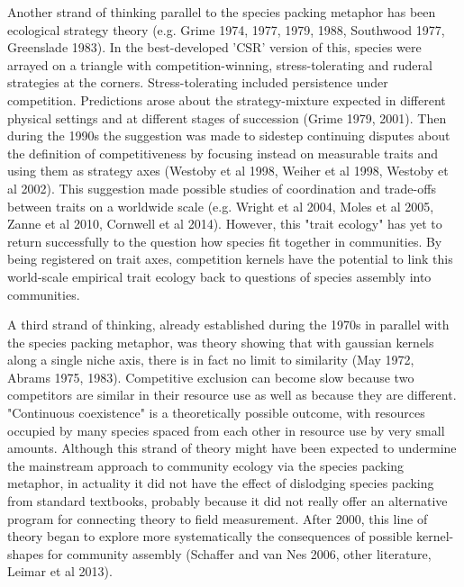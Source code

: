 \documentclass[a4paper,11pt]{article}
\begin{document}
Another strand of thinking parallel to the species packing metaphor has been ecological strategy theory (e.g. Grime 1974, 1977, 1979, 1988, Southwood 1977, Greenslade 1983). In the best-developed 'CSR' version of this, species were arrayed on a triangle with competition-winning, stress-tolerating and ruderal strategies at the corners. Stress-tolerating included persistence under competition. Predictions arose about the strategy-mixture expected in different physical settings and at different stages of succession (Grime 1979, 2001). Then during the 1990s the suggestion was made to sidestep continuing disputes about the definition of competitiveness by focusing instead on measurable traits and using them as strategy axes (Westoby et al 1998, Weiher et al 1998, Westoby et al 2002). This suggestion made possible studies of coordination and trade-offs between traits on a worldwide scale (e.g. Wright et al 2004, Moles et al 2005, Zanne et al 2010, Cornwell et al 2014). However, this "trait ecology" has yet to return successfully to the question how species fit together in communities. By being registered on trait axes, competition kernels have the potential to link this world-scale empirical trait ecology back to questions of species assembly into communities. 

A third strand of thinking, already established during the 1970s in parallel with the species packing metaphor, was theory showing that with gaussian kernels along a single niche axis, there is in fact no limit to similarity (May 1972, Abrams 1975, 1983). Competitive exclusion can become slow because two competitors are similar in their resource use as well as because they are different. "Continuous coexistence" is a theoretically possible outcome, with resources occupied by many species spaced from each other in resource use by very small amounts. Although this strand of theory might have been expected to undermine the mainstream approach to community ecology via the species packing metaphor, in actuality it did not have the effect of dislodging species packing from standard textbooks, probably because it did not really offer an alternative program for connecting theory to field measurement.  After 2000, this line of theory began to explore more systematically the consequences of possible kernel-shapes for community assembly (Schaffer and van Nes 2006, other literature, Leimar et al 2013).   
\end{document}
